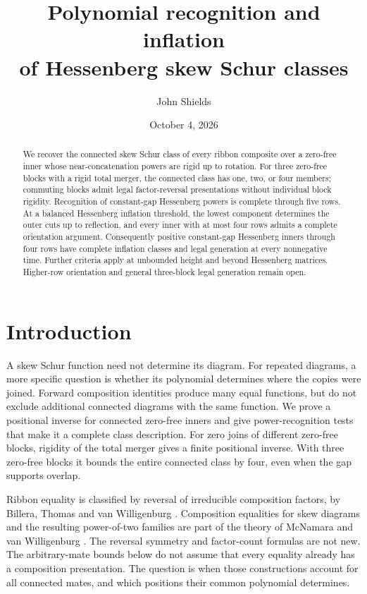 \documentclass[11pt,a4paper]{amsart}
\title[Polynomial recognition and inflation of Hessenberg skew Schur classes]
{Polynomial recognition and inflation\\
of Hessenberg skew Schur classes}
\author{John Shields}
\date{October 4, 2026}
\numberwithin{equation}{section}
\theoremstyle{plain}
\theoremstyle{definition}
\begin{document}
\begin{abstract}
We recover the connected skew Schur class of every ribbon composite over a zero-free inner whose near-concatenation powers are rigid up to rotation.  For three zero-free blocks with a rigid total merger, the connected class has one, two, or four members; commuting blocks admit legal factor-reversal presentations without individual block rigidity.  Recognition of constant-gap Hessenberg powers is complete through five rows.  At a balanced Hessenberg inflation threshold, the lowest component determines the outer cuts up to reflection, and every inner with at most four rows admits a complete orientation argument.  Consequently positive constant-gap Hessenberg inners through four rows have complete inflation classes and legal generation at every nonnegative time.  Further criteria apply at unbounded height and beyond Hessenberg matrices.  Higher-row orientation and general three-block legal generation remain open.
\end{abstract}
\maketitle

\section{Introduction}\label{sec:introduction}

A skew Schur function need not determine its diagram.  For repeated diagrams, a more specific question is whether its polynomial determines where the copies were joined.  Forward composition identities produce many equal functions, but do not exclude additional connected diagrams with the same function.  We prove a positional inverse for connected zero-free inners and give power-recognition tests that make it a complete class description.  For zero joins of different zero-free blocks, rigidity of the total merger gives a finite positional inverse.  With three zero-free blocks it bounds the entire connected class by four, even when the gap supports overlap.

Ribbon equality is classified by reversal of irreducible composition factors, by Billera, Thomas and van Willigenburg \cite[Thm.~4.1]{Billera2006DecomposableCompositions}.  Composition equalities for skew diagrams and the resulting power-of-two families are part of the theory of McNamara and van Willigenburg \cite[Thm.~5.3]{McNamara2009Classification}.  The reversal symmetry and factor-count formulas are not new.  The arbitrary-mate bounds below do not assume that every equality already has a composition presentation.  The question is when those constructions account for all connected mates, and which positions their common polynomial determines.
\end{document}
